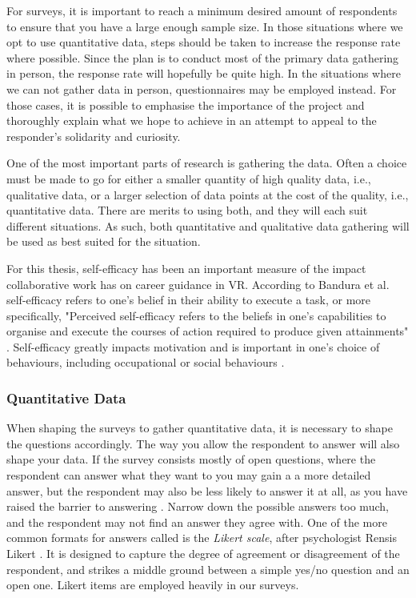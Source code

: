 For surveys, it is important to reach a minimum desired amount of respondents to ensure that you have a large enough sample size. In those situations where we opt to use quantitative data, steps should be taken to increase the response rate where possible. Since the plan is to conduct most of the primary data gathering in person, the response rate will hopefully be quite high. In the situations where we can not gather data in person, questionnaires may be employed instead. For those cases, it is possible to emphasise the importance of the project and thoroughly explain what we hope to achieve in an attempt to appeal to the responder's solidarity and curiosity. 

One of the most important parts of research is gathering the data. Often a choice must be made to go for either a smaller quantity of high quality data, i.e., qualitative data, or a larger selection of data points at the cost of the quality, i.e., quantitative data. There are merits to using both, and they will each suit different situations. As such, both quantitative and  qualitative data gathering will be used as best suited for the situation.

For this thesis, self-efficacy has been an important measure of the impact collaborative work has on career guidance in VR. According to Bandura et al. self-efficacy refers to one's belief in their ability to execute a task, or more specifically, "Perceived self-efficacy refers to the beliefs in one's capabilities to organise and execute the courses of action required to produce given attainments" \cite{bandura1999self}. Self-efficacy greatly impacts motivation and is important in one's choice of behaviours, including occupational or social behaviours \cite{bandura1999self}. 

\subsubsection{Quantitative Data}
When shaping the surveys to gather quantitative data, it is necessary to shape the questions accordingly. The way you allow the respondent to answer will also shape your data. If the survey consists mostly of open questions, where the respondent can answer what they want to you may gain a a more detailed answer, but the respondent may also be less likely to answer it at all, as you have raised the barrier to answering \cite{oates2005researching}. Narrow down the possible answers too much, and the respondent may not find an answer they agree with. One of the more common formats for answers called is the \textit{Likert scale}, after psychologist Rensis Likert \cite{likert1932technique}. It is designed to capture the degree of agreement or disagreement of the respondent, and strikes a middle ground between a simple yes/no question and an open one. Likert items are employed heavily in our surveys.


